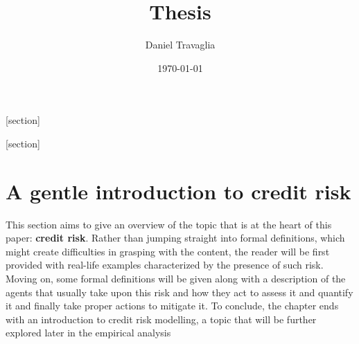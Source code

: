 \documentclass[a4paper,12pt]{article}
\begin{document}

    \setlength{\abovedisplayshortskip}{6pt}
    \setlength{\belowdisplayshortskip}{24pt}
    
    \setlength\parskip{0.5\baselineskip}

    [section]
    \newenvironment{definition}[1][]{\refstepcounter{definition}\par\medskip
        \noindent \textbf{Definition #1:} \rmfamily}{\medskip}

    [section]
    \newenvironment{example}[1][]{\refstepcounter{example}\par\medskip
        \noindent \textbf{Example~\theexample. #1} \rmfamily}{\medskip}
    
    \title{Thesis}
    \author{Daniel Travaglia}
    \date{\today}
    \maketitle

    \pagebreak

    \pagebreak
    
    \section{A gentle introduction to credit risk}

    This section aims to give an overview of the topic that is at the heart of this paper: \textbf{credit risk}. 
    Rather than jumping straight into formal definitions, which might create difficulties in grasping with the content, 
    the reader will be first provided with real-life examples characterized by the presence of such risk. 
    Moving on, some formal definitions will be given along with a description of the agents that usually take upon 
    this risk and how they act to assess it and quantify it and finally take proper actions to mitigate it. 
    To conclude, the chapter ends with an introduction to credit risk modelling, 
    a topic that will be further explored later in the empirical analysis
\end{document}

